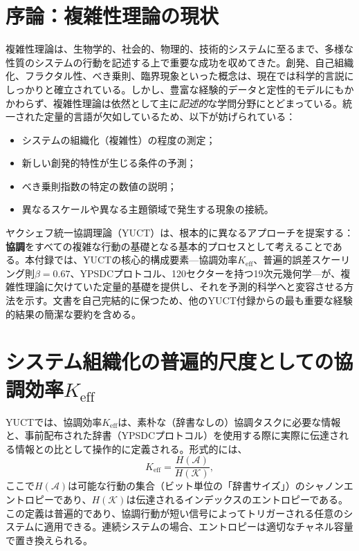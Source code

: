 \documentclass[11pt,a4paper]{article}
\theoremstyle{remark}
\newcommand{\Keff}{K_{\mathrm{eff}}}
\begin{document}
	\tableofcontents
	\newpage
	
	\section{序論：複雑性理論の現状}
	\label{sec:intro}
	
	複雑性理論は、生物学的、社会的、物理的、技術的システムに至るまで、多様な性質のシステムの行動を記述する上で重要な成功を収めてきた。創発、自己組織化、フラクタル性、べき乗則、臨界現象といった概念は、現在では科学的言説にしっかりと確立されている。しかし、豊富な経験的データと定性的モデルにもかかわらず、複雑性理論は依然として主に\emph{記述的}な学問分野にとどまっている。統一された定量的言語が欠如しているため、以下が妨げられている：
	\begin{itemize}
		\item システムの組織化（複雑性）の程度の測定；
		\item 新しい創発的特性が生じる条件の予測；
		\item べき乗則指数の特定の数値の説明；
		\item 異なるスケールや異なる主題領域で発生する現象の接続。
	\end{itemize}
	
	ヤクシェフ統一協調理論（YUCT）は、根本的に異なるアプローチを提案する：\textbf{協調}をすべての複雑な行動の基礎となる基本的プロセスとして考えることである。本付録では、YUCTの核心的構成要素—協調効率\(\Keff\)、普遍的誤差スケーリング則\(\beta = 0.67\)、YPSDCプロトコル、120セクターを持つ19次元幾何学—が、複雑性理論に欠けていた定量的基礎を提供し、それを予測的科学へと変容させる方法を示す。文書を自己完結的に保つため、他のYUCT付録からの最も重要な経験的結果の簡潔な要約を含める。
	
	\section{システム組織化の普遍的尺度としての協調効率\texorpdfstring{\(\Keff\)}{Keff}}
	\label{sec:keff}
	
	YUCTでは、協調効率\(\Keff\)は、素朴な（辞書なしの）協調タスクに必要な情報と、事前配布された辞書（YPSDCプロトコル）を使用する際に実際に伝達される情報との比として操作的に定義される。形式的には、
	\begin{equation}
		\Keff = \frac{H(\mathcal{A})}{H(\mathcal{K})},
	\end{equation}
	ここで\(H(\mathcal{A})\)は可能な行動の集合（ビット単位の「辞書サイズ」）のシャノンエントロピーであり、\(H(\mathcal{K})\)は伝達されるインデックスのエントロピーである。この定義は普遍的であり、協調行動が短い信号によってトリガーされる任意のシステムに適用できる。連続システムの場合、エントロピーは適切なチャネル容量で置き換えられる。
	
\end{document}

